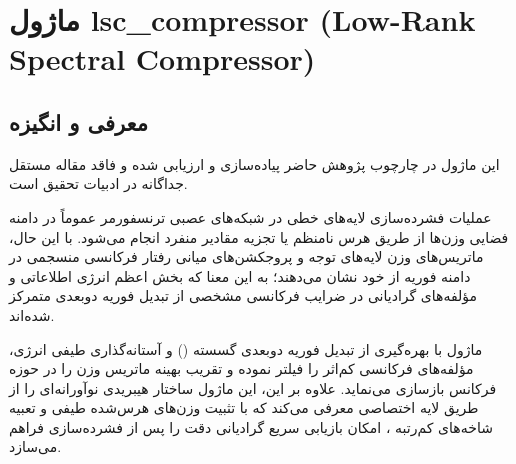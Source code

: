 \section{ماژول lsc\_compressor (Low-Rank Spectral Compressor)}
\label{sec:module_lsc_compressor}

\subsection{معرفی و انگیزه}
این ماژول در چارچوب پژوهش حاضر پیاده‌سازی و ارزیابی شده و فاقد مقاله مستقل جداگانه در ادبیات تحقیق است.

عملیات فشرده‌سازی لایه‌های خطی در شبکه‌های عصبی ترنسفورمر عموماً در دامنه فضایی وزن‌ها از طریق هرس نامنظم یا تجزیه مقادیر منفرد انجام می‌شود. با این حال، ماتریس‌های وزن لایه‌های توجه و پروجکشن‌های میانی رفتار فرکانسی منسجمی در دامنه فوریه از خود نشان می‌دهند؛ به این معنا که بخش اعظم انرژی اطلاعاتی و مؤلفه‌های گرادیانی در ضرایب فرکانسی مشخصی از تبدیل فوریه دو‌بعدی متمرکز شده‌اند.

ماژول  با بهره‌گیری از تبدیل فوریه دو‌بعدی گسسته () و آستانه‌گذاری طیفی انرژی، مؤلفه‌های فرکانسی کم‌اثر را فیلتر نموده و تقریب بهینه ماتریس وزن را در حوزه فرکانس بازسازی می‌نماید. علاوه بر این، این ماژول ساختار هیبریدی نوآورانه‌ای را از طریق لایه اختصاصی  معرفی می‌کند که با تثبیت وزن‌های هرس‌شده طیفی و تعبیه شاخه‌های کم‌رتبه ، امکان بازیابی سریع گرادیانی دقت را پس از فشرده‌سازی فراهم می‌سازد.

